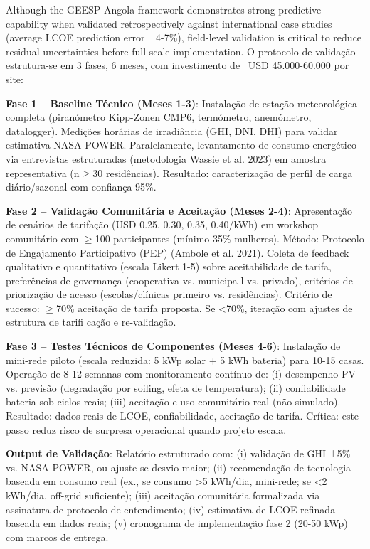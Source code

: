 \documentclass[12pt, a4paper]{article}
\begin{document}
Although the GEESP-Angola framework demonstrates strong predictive capability when validated retrospectively against international case studies (average LCOE prediction error ±4-7\%), field-level validation is critical to reduce residual uncertainties before full-scale implementation. O protocolo de validação estrutura-se em 3 fases, 6 meses, com investimento de ~USD 45.000-60.000 por site:

\textbf{Fase 1 – Baseline Técnico (Meses 1-3)}: Instalação de estação meteorológica completa (piranómetro Kipp-Zonen CMP6, termómetro, anemómetro, datalogger). Medições horárias de irradiância (GHI, DNI, DHI) para validar estimativa NASA POWER. Paralelamente, levantamento de consumo energético via entrevistas estruturadas (metodologia Wassie et al. 2023) em amostra representativa (n$\geq$30 residências). Resultado: caracterização de perfil de carga diário/sazonal com confiança 95\%.

\textbf{Fase 2 – Validação Comunitária e Aceitação (Meses 2-4)}: Apresentação de cenários de tarifação (USD 0.25, 0.30, 0.35, 0.40/kWh) em workshop comunitário com $\geq$100 participantes (mínimo 35\% mulheres). Método: Protocolo de Engajamento Participativo (PEP) (Ambole et al. 2021). Coleta de feedback qualitativo e quantitativo (escala Likert 1-5) sobre aceitabilidade de tarifa, preferências de governança (cooperativa vs. municipa
l vs. privado), critérios de priorização de acesso (escolas/clínicas primeiro vs. residências). Critério de sucesso: $\geq$70\% aceitação de tarifa proposta. Se <70\%, iteração com ajustes de estrutura de tarifi cação e re-validação.

\textbf{Fase 3 – Testes Técnicos de Componentes (Meses 4-6)}: Instalação de mini-rede piloto (escala reduzida: 5 kWp solar + 5 kWh bateria) para 10-15 casas. Operação de 8-12 semanas com monitoramento contínuo de: (i) desempenho PV vs. previsão (degradação por soiling, efeta de temperatura); (ii) confiabilidade bateria sob ciclos reais; (iii) aceitação e uso comunitário real (não simulado). Resultado: dados reais de LCOE, confiabilidade, aceitação de tarifa. Crítica: este passo reduz risco de surpresa operacional quando projeto escala.

\textbf{Output de Validação}: Relatório estruturado com: (i) validação de GHI ±5\% vs. NASA POWER, ou ajuste se desvio maior; (ii) recomendação de tecnologia baseada em consumo real (ex., se consumo >5 kWh/dia, mini-rede; se <2 kWh/dia, off-grid suficiente); (iii) aceitação comunitária formalizada via assinatura de protocolo de entendimento; (iv) estimativa de LCOE refinada baseada em dados reais; (v) cronograma de implementação fase 2 (20-50 kWp) com marcos de entrega.
\end{document}
